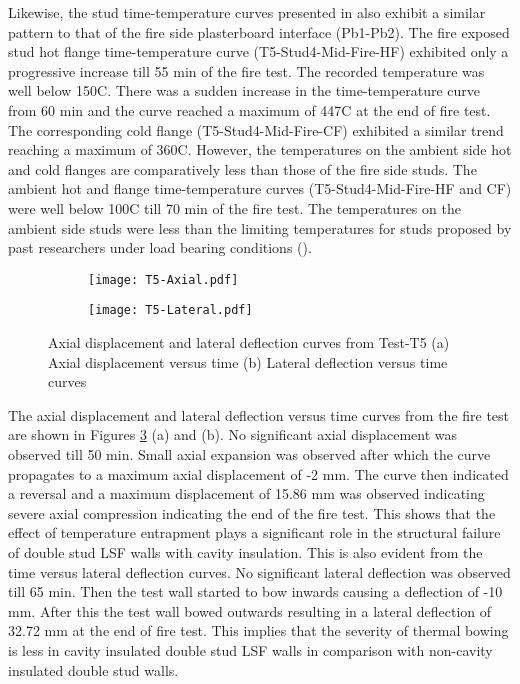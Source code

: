 Likewise, the stud time-temperature curves presented in  also exhibit a similar pattern to that of the fire side plasterboard interface (Pb1-Pb2). The fire exposed stud hot flange time-temperature curve (T5-Stud4-Mid-Fire-HF) exhibited only a progressive increase till 55 min of the fire test. The recorded temperature was well below 150\degree C. There was a sudden increase in the time-temperature curve from 60 min and the curve reached a maximum of 447\degree C at the end of fire test. The corresponding cold flange (T5-Stud4-Mid-Fire-CF) exhibited a similar trend reaching a maximum of 360\degree C. However, the temperatures on the ambient side hot and cold flanges are comparatively less than those of the fire side studs. The ambient hot and flange time-temperature curves (T5-Stud4-Mid-Fire-HF and CF) were well below 100\degree C till 70 min of the fire test. The temperatures on the ambient side studs were less than the limiting temperatures for studs proposed by past researchers under load bearing conditions (\cite{Feng2003,Gunalan2013a}). 
\begin{figure}[!htbp]
	\centering
	\begin{subfigure}[b]{0.7\textwidth}
		\centering
		\texttt{[image: T5-Axial.pdf]}
		\caption{}
		\label{subfig:T5-Axial}
	\end{subfigure}
	\begin{subfigure}[b]{0.7\textwidth}
		\centering
		\texttt{[image: T5-Lateral.pdf]}
		\caption{}
		\label{subfig:T5-Lateral}
	\end{subfigure}
	   \caption{Axial displacement and lateral deflection curves from Test-T5 (a) Axial displacement versus time (b) Lateral deflection versus time curves}
	   \label{fig:T5-Axial-Lateral}
\end{figure}

The axial displacement and lateral deflection versus time curves from the fire test are shown in Figures \ref{fig:T5-Axial-Lateral} (a) and (b). No significant axial displacement was observed till 50 min. Small axial expansion was observed after which the curve propagates to a maximum axial displacement of -2 mm. The curve then indicated a reversal and a maximum displacement of 15.86 mm was observed indicating severe axial compression indicating the end of the fire test. This shows that the effect of temperature entrapment plays a significant role in the structural failure of double stud LSF walls with cavity insulation. This is also evident from the time versus lateral deflection curves. No significant lateral deflection was observed till 65 min. Then the test wall started to bow inwards causing a deflection of -10 mm. After this the test wall bowed outwards resulting in a lateral deflection of 32.72 mm at the end of fire test. This implies that the severity of thermal bowing is less in cavity insulated double stud LSF walls in comparison with non-cavity insulated double stud walls. 

